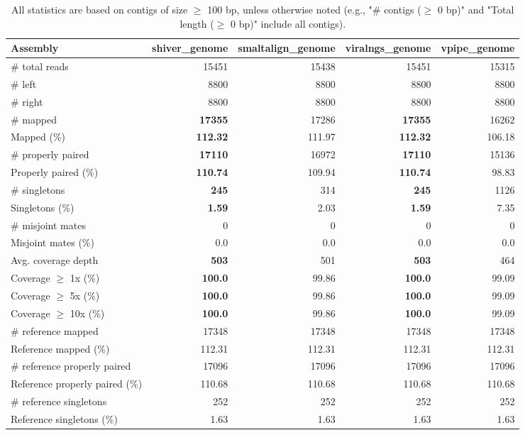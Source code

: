 \documentclass[12pt,a4paper]{article}
\begin{document}
\begin{table}[ht]
\begin{center}
\caption{All statistics are based on contigs of size $\geq$ 100 bp, unless otherwise noted (e.g., "\# contigs ($\geq$ 0 bp)" and "Total length ($\geq$ 0 bp)" include all contigs).}
\begin{tabular}{|l*{4}{|r}|}
\hline
Assembly & shiver\_genome & smaltalign\_genome & viralngs\_genome & vpipe\_genome \\ \hline
\# total reads & 15451 & 15438 & 15451 & 15315 \\ \hline
\# left & 8800 & 8800 & 8800 & 8800 \\ \hline
\# right & 8800 & 8800 & 8800 & 8800 \\ \hline
\# mapped & {\bf 17355} & 17286 & {\bf 17355} & 16262 \\ \hline
Mapped (\%) & {\bf 112.32} & 111.97 & {\bf 112.32} & 106.18 \\ \hline
\# properly paired & {\bf 17110} & 16972 & {\bf 17110} & 15136 \\ \hline
Properly paired (\%) & {\bf 110.74} & 109.94 & {\bf 110.74} & 98.83 \\ \hline
\# singletons & {\bf 245} & 314 & {\bf 245} & 1126 \\ \hline
Singletons (\%) & {\bf 1.59} & 2.03 & {\bf 1.59} & 7.35 \\ \hline
\# misjoint mates & 0 & 0 & 0 & 0 \\ \hline
Misjoint mates (\%) & 0.0 & 0.0 & 0.0 & 0.0 \\ \hline
Avg. coverage depth & {\bf 503} & 501 & {\bf 503} & 464 \\ \hline
Coverage $\geq$ 1x (\%) & {\bf 100.0} & 99.86 & {\bf 100.0} & 99.09 \\ \hline
Coverage $\geq$ 5x (\%) & {\bf 100.0} & 99.86 & {\bf 100.0} & 99.09 \\ \hline
Coverage $\geq$ 10x (\%) & {\bf 100.0} & 99.86 & {\bf 100.0} & 99.09 \\ \hline
\# reference mapped & 17348 & 17348 & 17348 & 17348 \\ \hline
Reference mapped (\%) & 112.31 & 112.31 & 112.31 & 112.31 \\ \hline
\# reference properly paired & 17096 & 17096 & 17096 & 17096 \\ \hline
Reference properly paired (\%) & 110.68 & 110.68 & 110.68 & 110.68 \\ \hline
\# reference singletons & 252 & 252 & 252 & 252 \\ \hline
Reference singletons (\%) & 1.63 & 1.63 & 1.63 & 1.63 \\ \hline

\end{tabular}
\end{center}
\end{table}
\end{document}
